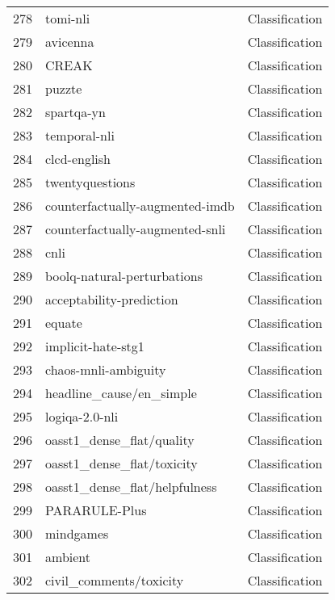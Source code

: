 \documentclass[11pt]{article}
\begin{document}
\begin{longtable}{lll}
278 & tomi-nli & Classification \\
279 & avicenna \citep{aghahadi2022avicenna} & Classification \\
280 & CREAK & Classification \\
281 & puzzte \citep{szomiu2021puzzle} & Classification \\
282 & spartqa-yn \citep{mirzaee-etal-2021-spartqa} & Classification \\
283 & temporal-nli \citep{thukral-etal-2021-probing} & Classification \\
284 & clcd-english & Classification \\
285 & twentyquestions & Classification \\
286 & counterfactually-augmented-imdb \citep{kaushik2020learning} & Classification \\
287 & counterfactually-augmented-snli \citep{kaushik2020learning} & Classification \\
288 & cnli \citep{huang2020cnligeneralization} & Classification \\
289 & boolq-natural-perturbations \citep{khashabi2020naturalperturbations} & Classification \\
290 & acceptability-prediction \citep{lau-etal-2015-unsupervised} & Classification \\
291 & equate \citep{ravichander2019equate} & Classification \\
292 & implicit-hate-stg1 \citep{elsherief-etal-2021-latent} & Classification \\
293 & chaos-mnli-ambiguity \citep{xzhou2022distnli} & Classification \\
294 & headline\_cause/en\_simple \citep{gusev2021headlinecause} & Classification \\
295 & logiqa-2.0-nli & Classification \\
296 & oasst1\_dense\_flat/quality & Classification \\
297 & oasst1\_dense\_flat/toxicity & Classification \\
298 & oasst1\_dense\_flat/helpfulness & Classification \\
299 & PARARULE-Plus \citep{bao2022multi} & Classification \\
300 & mindgames \citep{sileo2023mindgames} & Classification \\
301 & ambient \citep{liu-etal-2023-afraid} & Classification \\
302 & civil\_comments/toxicity \citep{DBLP:journals/corr/abs-1903-04561} & Classification \\

\end{longtable}
\end{document}
